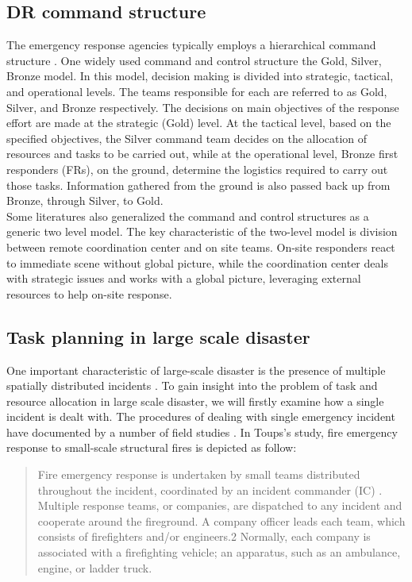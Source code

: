 \subsection{DR command structure}
The emergency response agencies typically employs a hierarchical command structure \cite{Ramchurn}. One widely used command and control structure the Gold, Silver, Bronze model. In this model, decision making is divided into strategic, tactical, and operational levels. The teams responsible for each are referred to as Gold, Silver, and Bronze respectively. The decisions on main objectives of the response effort are made at the strategic (Gold) level. At the tactical level, based on the specified objectives, the Silver command team decides on the allocation of resources and tasks to be carried out, while at the operational level, Bronze first responders (FRs), on the ground, determine the logistics required to carry out those tasks. Information gathered from the ground is also passed back up from Bronze, through Silver, to Gold.\\

Some literatures \cite{Chen2005,Chen2008} also generalized the command and control structures as a generic two level model. The key characteristic of the two-level model is division between remote coordination center and on site teams.  On-site responders react to immediate scene without global picture, while the coordination center deals with strategic issues and works with a global picture, leveraging external resources to help on-site response. \\


\subsection{Task planning in large scale disaster} \label{sec:LRtaskplanning}
One important characteristic of large-scale disaster is the presence of multiple spatially distributed incidents \cite{Chen2005}. To gain insight into the problem of task and resource allocation in large scale disaster, we will firstly examine how a single incident is dealt with. The procedures of dealing with single emergency incident have documented by a number of field studies \cite{Comfort2004,Dawes2004,Petrescu-prahova2005}. In Toups's \cite{Toups2011} study, fire emergency response to small-scale structural fires is depicted as follow: 

\begin{quote}
Fire emergency response is undertaken by small teams distributed throughout the incident, coordinated by an incident commander (IC) . Multiple response teams, or companies, are dispatched to any incident and cooperate around the fireground. A company officer leads each team, which consists of firefighters and/or engineers.2 Normally, each company is associated with a firefighting vehicle; an apparatus, such as an ambulance, engine, or ladder truck.\\
\end{quote}

